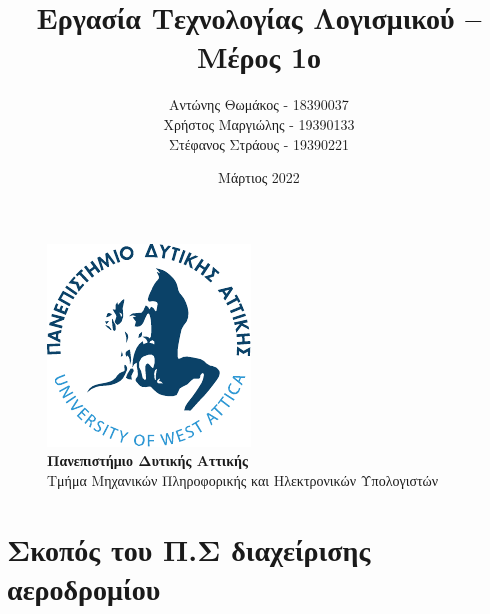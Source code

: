\documentclass[12pt]{article}
\title{Εργασία Τεχνολογίας Λογισμικού -- Μέρος 1ο}
\author{Αντώνης Θωμάκος - 18390037 \\
Χρήστος Μαργιώλης - 19390133 \\
Στέφανος Στράους - 19390221}
\date{Μάρτιος 2022}
\begin{document}
\begin{titlepage}
        \maketitle
        \begin{figure}[t!]
        \begin{center}
        \includegraphics[scale=1.0]{./res/uniwa-logo.pdf} \\
        \Large
        \textbf{Πανεπιστήμιο Δυτικής Αττικής} \\
        \large
        Τμήμα Μηχανικών Πληροφορικής και Ηλεκτρονικών Υπολογιστών
        \end{center}
        \end{figure}
\end{titlepage}

\renewcommand{\contentsname}{Περιεχόμενα}
\tableofcontents
\pagebreak

\section{Σκοπός του Π.Σ διαχείρισης αεροδρομίου}
\end{document}
